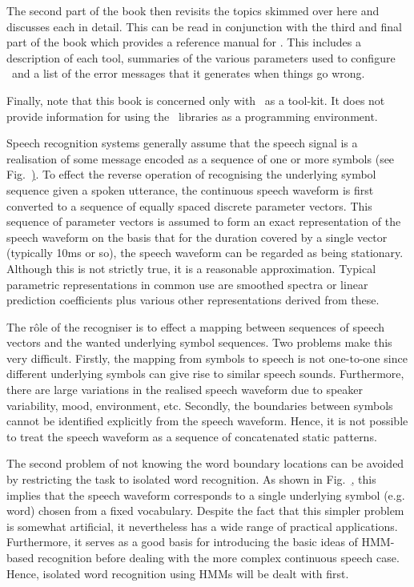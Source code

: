 The second part of the book then revisits the topics skimmed over here
and discusses each in detail. This can be 
read in conjunction with the third and final part
of the book which provides a reference manual for \HTK.  This includes
a description of each tool,  summaries of the various
parameters used to configure \HTK\ and a list of the error messages that
it generates when things go wrong.

Finally, note that this book is concerned only with \HTK\ as a tool-kit.
It does not provide  information for using the \HTK\ libraries as a programming
environment.


Speech recognition systems generally assume that the speech signal is
a  realisation of some message encoded as a sequence of one or more
symbols (see Fig.~\href{f:messencode}). To effect the reverse
operation of recognising the underlying symbol sequence given a spoken
utterance, the continuous speech waveform is first converted to a
sequence of equally spaced discrete parameter vectors. This sequence
of parameter vectors is assumed to form an exact representation of
the speech waveform on the basis that for the duration covered by a
single vector (typically 10ms or so), the speech waveform can be
regarded as being stationary.  Although this is not strictly true, it
is  a reasonable approximation.  Typical parametric representations in
common use are smoothed spectra or linear prediction coefficients plus
various other representations derived from these.

The r\^{o}le of the recogniser is to effect a mapping between  sequences
of speech vectors and the wanted underlying symbol sequences.  Two
problems make this very difficult.  Firstly, the mapping from symbols
to speech is not one-to-one since different underlying symbols can
give rise to similar speech sounds.  Furthermore, there are large
variations in the realised speech waveform due to speaker variability,
mood, environment, etc.  Secondly, the boundaries between symbols
cannot be identified explicitly from the speech waveform.  Hence, it
is not possible to treat the speech waveform as a sequence of
concatenated static patterns. 

The second problem of not knowing the word boundary locations
can be avoided by restricting the task to
isolated word recognition.  As shown in Fig.~\href{f:isoprob},
this implies that the speech waveform corresponds to a single
underlying symbol (e.g. word) chosen from a fixed vocabulary.
Despite the fact that this
simpler problem is somewhat artificial, it nevertheless has 
a wide range of practical applications.
Furthermore, it serves as a good basis for 
introducing the basic ideas of HMM-based
recognition before dealing with the more complex continuous speech
case.  Hence, isolated word recognition using HMMs will be dealt
with first.

